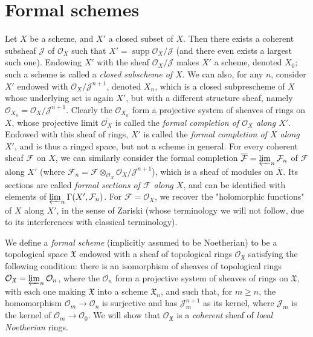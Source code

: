 \section{Formal schemes}\label{fga2-2}

Let $X$ be a scheme, and $X'$ a closed subset of $X$.
Then there exists a coherent subsheaf $\mathcal{J}$ of $\mathcal{O}_X$ such that $X'=\operatorname{supp}\mathcal{O}_X/\mathcal{J}$ (and there even exists a largest such one).
Endowing $X'$ with the sheaf $\mathcal{O}_X/\mathcal{J}$ makes $X'$ a scheme, denoted $X_0$;
such a scheme is called a \emph{closed subscheme of $X$}.
We can also, for any $n$, consider $X'$ endowed with $\mathcal{O}_X/\mathcal{J}^{n+1}$, denoted $X_n$, which is a closed subprescheme of $X$ whose underlying set is again $X'$, but with a different structure sheaf, namely $\mathcal{O}_{X_n}=\mathcal{O}_X/\mathcal{J}^{n+1}$.
Clearly the $\mathcal{O}_{X_n}$ form a projective system of sheaves of rings on $X$, whose projective limit $\overline{\mathcal{O}_X}$ is called the \emph{formal completion of $\mathcal{O}_X$ along $X'$}.
Endowed with this sheaf of rings, $X'$ is called the \emph{formal completion of $X$ along $X'$}, and is thus a ringed space, but not a scheme in general.
For every coherent sheaf $\mathcal{F}$ on $X$, we can similarly consider the formal completion $\overline{\mathcal{F}}=\varprojlim_n\mathcal{F}_n$ of $\mathcal{F}$ along $X'$ (where $\mathcal{F}_n=\mathcal{F}\otimes_{\mathcal{O}_X}\mathcal{O}_X/\mathcal{J}^{n+1}$), which is a sheaf of modules on $\overline{X}$.
Its sections are called \emph{formal sections of $\mathcal{F}$ along $X$}, and can be identified with elements of $\varprojlim_n\operatorname{\Gamma}(X',\mathcal{F}_n)$.
For $\mathcal{F}=\mathcal{O}_X$, we recover the "holomorphic functions" of $X$ along $X'$, in the sense of Zariski (whose terminology we will not follow, due to its interferences with classical terminology).

We define a \emph{formal scheme} (implicitly assumed to be Noetherian) to be a topological space $\mathfrak{X}$ endowed with a sheaf of topological rings $\mathcal{O}_{\mathfrak{X}}$ satisfying the following condition:
there is an isomorphism of sheaves of topological rings $\mathcal{O}_{\mathfrak{X}}=\varprojlim_n\mathcal{O}_n$, where the $\mathcal{O}_n$ form a projective system of sheaves of rings on $\mathfrak{X}$, with each one making $\mathfrak{X}$ into a scheme $\mathfrak{X}_n$, and such that, for $m\geqslant n$, the homomorphism $\mathcal{O}_m\to\mathcal{O}_n$ is surjective and has $\mathcal{J}_m^{n+1}$ as its kernel, where $\mathcal{J}_m$ is the kernel of $\mathcal{O}_m\to\mathcal{O}_0$.
We will show that $\mathcal{O}_{\mathfrak{X}}$ is a \emph{coherent} sheaf of \emph{local Noetherian} rings.

